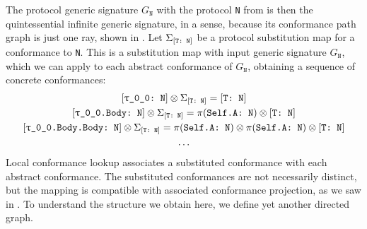 \documentclass[../generics]{subfiles}
\begin{document}
\begin{figure}\label{ray conformance path graph}
\begin{center}
\end{center}
\end{figure}

The protocol generic signature $G_\texttt{N}$ with the protocol \texttt{N} from  is then the quintessential infinite generic signature, in a sense, because its conformance path graph is just one ray, shown in . Let $\Sigma_{[\texttt{T:~N}]}$ be a protocol substitution map for a conformance to \texttt{N}. This is a substitution map with input generic signature $G_\texttt{N}$, which we can apply to each abstract conformance of $G_\texttt{N}$, obtaining a sequence of concrete conformances:
\begin{gather*}
\ConfReq{\ttgp{0}{0}}{N}\otimes\Sigma_{\ConfReq{T}{N}}=\ConfReq{T}{N}\\
\ConfReq{\ttgp{0}{0}.Body}{N}\otimes\Sigma_{\ConfReq{T}{N}}=\SelfAToN\otimes\ConfReq{T}{N}\\
\ConfReq{\ttgp{0}{0}.Body.Body}{N}\otimes\Sigma_{\ConfReq{T}{N}}=\SelfAToN\otimes\SelfAToN\otimes\ConfReq{T}{N}\\
\ldots
\end{gather*}
Local conformance lookup associates a substituted conformance with each abstract conformance. The substituted conformances are not necessarily distinct, but the mapping is compatible with associated conformance projection, as we saw in . To understand the structure we obtain here, we define yet another directed graph.
\end{document}
